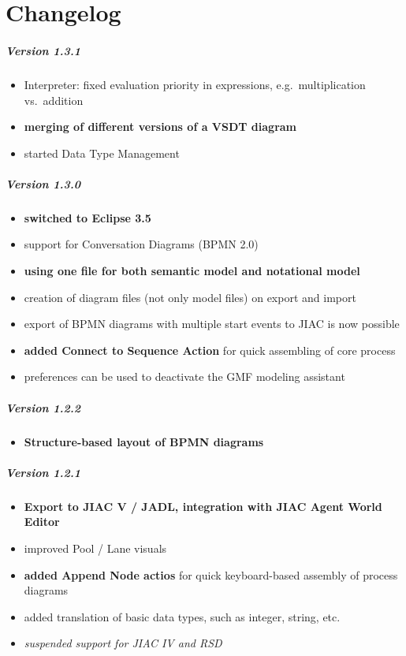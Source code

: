
\chapter{Changelog}
\label{sec:changelog}

\paragraph{Version 1.3.1}
\begin{itemize}
	\item Interpreter: fixed evaluation priority in expressions, e.g.\ multiplication vs.\ addition
	\item \textbf{merging of different versions of a VSDT diagram}
	\item started Data Type Management
\end{itemize}

\paragraph{Version 1.3.0}
\begin{itemize}
	\item \textbf{switched to Eclipse 3.5}
	\item support for Conversation Diagrams (BPMN 2.0)
	\item \textbf{using one file for both semantic model and notational model}
	\item creation of diagram files (not only model files) on export and import
	\item export of BPMN diagrams with multiple start events to JIAC is now possible
	\item \textbf{added Connect to Sequence Action} for quick assembling of core process
	\item preferences can be used to deactivate the GMF modeling assistant
\end{itemize}

\paragraph{Version 1.2.2}
\begin{itemize}
	\item \textbf{Structure-based layout of BPMN diagrams}
\end{itemize}

\paragraph{Version 1.2.1}
\begin{itemize}
	\item \textbf{Export to JIAC V / JADL, integration with JIAC Agent World Editor}
	\item improved Pool / Lane visuals
	\item \textbf{added Append Node actios} for quick keyboard-based assembly of process diagrams
	\item added translation of basic data types, such as integer, string, etc.
	\item \textit{suspended support for JIAC IV and RSD}
\end{itemize}

